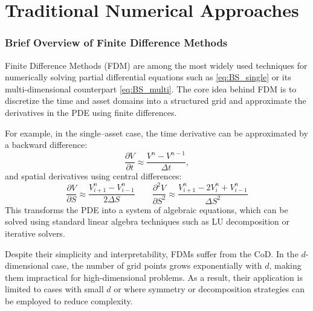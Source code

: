 \documentclass[12pt]{report} %
\theoremstyle{plain}           %
\theoremstyle{definition}      %
\theoremstyle{remark}          %
\begin{document}
\section{Traditional Numerical Approaches}

\subsubsection{Brief Overview of Finite Difference Methods}
Finite Difference Methods (FDM) are among the most widely used techniques for numerically 
solving partial differential equations such as \eqref{eq:BS_single} or its multi-dimensional 
counterpart \eqref{eq:BS_multi}. The core idea behind FDM is to discretize the time and 
asset domains into a structured grid and approximate the derivatives in the PDE using finite 
differences.

For example, in the single–asset case, the time derivative can be approximated by a backward 
difference:
\begin{equation}
	\frac{\partial V}{\partial t} \approx \frac{V^{n} - V^{n-1}}{\Delta t},
\end{equation}
and spatial derivatives using central differences:
\begin{equation}
	\frac{\partial V}{\partial S} \approx \frac{V_{i+1}^n - V_{i-1}^n}{2\Delta S}
	\qquad
	\frac{\partial^2 V}{\partial S^2} \approx \frac{V_{i+1}^n - 2V_i^n + V_{i-1}^n}{\Delta S^2}
\end{equation}
This transforms the PDE into a system of algebraic equations, which can be solved using 
standard linear algebra techniques such as LU decomposition or iterative solvers.

Despite their simplicity and interpretability, FDMs suffer from the 
CoD. In the $d$-dimensional case, the number of grid points grows 
exponentially with $d$, making them impractical for high-dimensional problems. As a result, 
their application is limited to cases with small $d$ or where symmetry or decomposition 
strategies can be employed to reduce complexity.
\end{document}
